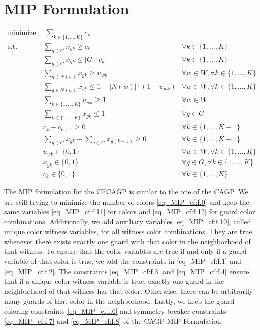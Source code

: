 \section{MIP Formulation}

\begin{align}
\label{eq_MIP_cf:f.0} \mbox{minimize}~& \;\sum_{k\in \{1,\ldots,K\}} c_{k}& \\
\label{eq_MIP_cf:f.1} \mbox{s.t. } &\sum_{g \in G}x_{gk} \geq c_{k} & \forall k\in \{1,\ldots,K\}\\
\label{eq_MIP_cf:f.2}&\sum_{g\in G}x_{gk} \leq |G|\cdot  c_{k} & \forall k\in \{1,\ldots,K\}\\
\label{eq_MIP_cf:f.3}&\sum_{g\in N(w)}x_{gk} \geq u_{wk} & \forall w\in W, \forall k\in \{1,\ldots,K\}\\
\label{eq_MIP_cf:f.4}&\sum_{g\in N(w)}x_{gk} \leq 1 + |N(w)|\cdot  (1-u_{wk}) & \forall w\in W, \forall k\in \{1,\ldots,K\}\\
\label{eq_MIP_cf:f.5}&\sum_{k\in \{1,\ldots,K\}}u_{wk} \geq 1 & \forall w\in W\\
\label{eq_MIP_cf:f.6}&\sum_{k\in \{1,\ldots,K\}}x_{gk} \leq 1 & \forall g\in G\\
\label{eq_MIP_cf:f.7}&c_{k} - c_{k+1} \geq 0 & \forall k\in \{1,\ldots,K-1\}\\
\label{eq_MIP_cf:f.8}&\sum_{g\in G}x_{gk} - \sum_{g\in G}x_{g(k+1)} \geq 0 & \forall k\in \{1,\ldots,K-1\}\\
\label{eq_MIP_cf:f.10}& u_{wk} \in \{0,1\} & \forall w\in W, \forall k\in \{1,\ldots,K\}\\
\label{eq_MIP_cf:f.11}& x_{gk} \in \{0,1\} & \forall g\in G, \forall k\in \{1,\ldots,K\}\\
\label{eq_MIP_cf:f.12}& c_{k}\in \{0,1\} & \forall k\in \{1,\ldots,K\}
\end{align}

The MIP formulation for the CFCAGP is similar to the one of the CAGP. We are still trying to minimize the number of colors \cref{eq_MIP_cf:f.0} and keep the same variables \cref{eq_MIP_cf:f.11} for colors and \cref{eq_MIP_cf:f.12} for guard color combinations. Additionally, we add auxiliary variables \cref{eq_MIP_cf:f.10}, called unique color witness variables, for all witness color combinations. They are true whenever there exists exactly one guard with that color in the neighborhood of that witness. To ensure that the color variables are true if and only if a guard variable of that color is true, we add the constraints in \cref{eq_MIP_cf:f.1} and \cref{eq_MIP_cf:f.2}. The constraints \cref{eq_MIP_cf:f.3} and \cref{eq_MIP_cf:f.4} ensure that if a unique color witness variable is true, exactly one guard in the neighborhood of that witness has that color. Otherwise, there can be arbitrarily many guards of that color in the neighborhood. Lastly, we keep the guard coloring constraints \cref{eq_MIP_cf:f.6} and symmetry breaker constraints \cref{eq_MIP_cf:f.7} and \cref{eq_MIP_cf:f.8} of the CAGP MIP Formulation.

